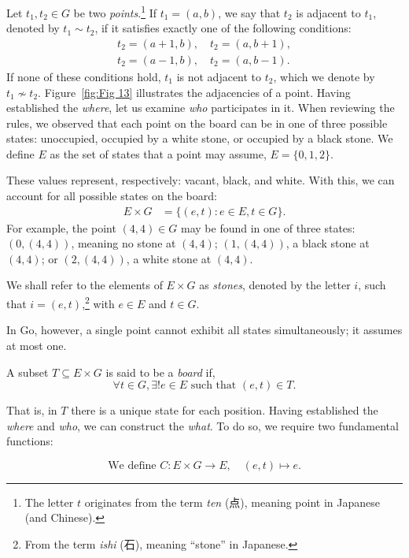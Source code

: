 Let $t_1, t_2 \in G$ be two \textit{points}.\footnote{The letter $t$ originates from the term \textit{ten} (点), meaning point in Japanese (and Chinese).} If $t_1=(a,b)$, we say that $t_2$ is adjacent to $t_1$, denoted by $t_1 \sim t_2$, if it satisfies exactly one of the following conditions:
\begin{align*}
t_2 = (a+1,b), \quad t_2 = (a,b+1),\\
t_2 = (a-1,b), \quad t_2 = (a,b-1).
\end{align*}
If none of these conditions hold, $t_1$ is not adjacent to $t_2$, which we denote by $t_1 \nsim t_2$. Figure~\ref{fig:Fig 13} illustrates the adjacencies of a point.
Having established the \textit{where}, let us examine \textit{who} participates in it. When reviewing the rules, we observed that each point on the board can be in one of three possible states: unoccupied, occupied by a white stone, or occupied by a black stone. We define $E$ as the set of states that a point may assume, $E=\{0,1,2\}$.

These values represent, respectively: vacant, black, and white. With this, we can account for all possible states on the board:
\begin{align*}
	E \times G &= \{(e,t) : e \in E, t \in G \}.
\end{align*}
For example, the point $(4,4) \in G$ may be found in one of three states: $(0,(4,4))$, meaning no stone at $(4,4)$; $(1,(4,4))$, a black stone at $(4,4)$; or $(2,(4,4))$, a white stone at $(4,4)$.

We shall refer to the elements of $E \times G$ as \textit{stones}, denoted by the letter $i$, such that $i=(e,t)$,\footnote{From the term \textit{ishi} (石), meaning ``stone'' in Japanese.} with $e \in E$ and $t \in G$. 

In Go, however, a single point cannot exhibit all states simultaneously; it assumes at most one.

\begin{definition}[Board]
	A subset $T \subseteq E \times G$ is said to be a \textit{board} if,
	$$\forall t \in G, \exists! e \in E \text{ such that } (e, t) \in T.$$

\end{definition}

That is, in $T$ there is a unique state for each position. Having established the \textit{where} and \textit{who}, we can construct the \textit{what}. To do so, we require two fundamental functions:

\begin{definition}
	\label{funcioncolor}$$\text{We define } C: E \times G \to E, \quad (e,t) \mapsto e.$$
	\end{definition}
	
